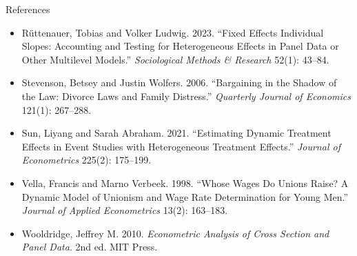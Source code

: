 \documentclass[aspectratio=169,11pt,xcolor=dvipsnames]{beamer}
\begin{document}
\begin{frame}[allowframebreaks,t]{References}
\begin{itemize}
\item Rüttenauer, Tobias and Volker Ludwig. 2023. ``Fixed Effects Individual Slopes: Accounting and Testing for Heterogeneous Effects in Panel Data or Other Multilevel Models.'' \textit{Sociological Methods \& Research} 52(1): 43--84.
\item Stevenson, Betsey and Justin Wolfers. 2006. ``Bargaining in the Shadow of the Law: Divorce Laws and Family Distress.'' \textit{Quarterly Journal of Economics} 121(1): 267--288.
\item Sun, Liyang and Sarah Abraham. 2021. ``Estimating Dynamic Treatment Effects in Event Studies with Heterogeneous Treatment Effects.'' \textit{Journal of Econometrics} 225(2): 175--199.
\item Vella, Francis and Marno Verbeek. 1998. ``Whose Wages Do Unions Raise? A Dynamic Model of Unionism and Wage Rate Determination for Young Men.'' \textit{Journal of Applied Econometrics} 13(2): 163--183.
\item Wooldridge, Jeffrey M. 2010. \textit{Econometric Analysis of Cross Section and Panel Data}. 2nd ed. MIT Press.
\end{itemize}
\end{frame}
\end{document}
